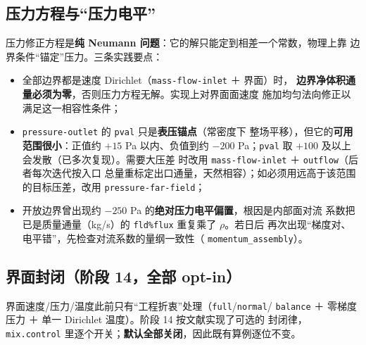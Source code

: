 \documentclass[11pt,a4paper]{ctexart}
\begin{document}
\subsection{压力方程与``压力电平''}

压力修正方程是\textbf{纯 Neumann 问题}：它的解只能定到相差一个常数，物理上靠
边界条件``锚定''压力。三条实践要点：

\begin{itemize}\itemsep2pt
  \item 全部边界都是速度 Dirichlet（\texttt{mass-flow-inlet} ＋ 界面）时，
        \textbf{边界净体积通量必须为零}，否则压力方程无解。实现上对界面面速度
        施加均匀法向修正以满足这一相容性条件；
  \item \texttt{pressure-outlet} 的 \texttt{pval} 只是\textbf{表压锚点}（常密度下
        整场平移），但它的\textbf{可用范围很小}：正值约 $+15$ Pa 以内、负值到约
        $-200$ Pa；\texttt{pval} 取 $+100$ 及以上会发散（已多次复现）。需要大压差
        时改用 \texttt{mass-flow-inlet} ＋ \texttt{outflow}（后者每次迭代按入口
        总量重标定出口通量，天然相容）；如必须用远高于该范围的目标压差，改用
        \texttt{pressure-far-field}；
  \item 开放边界曾出现约 $-250$ Pa 的\textbf{绝对压力电平偏置}，根因是内部面对流
        系数把已是质量通量（kg/s）的 \texttt{fld\%flux} 重复乘了 $\rho$。若日后
        再次出现``梯度对、电平错''，先检查对流系数的量纲一致性（
        \texttt{momentum\_assembly}）。
\end{itemize}

\subsection{界面封闭（阶段 14，全部 opt-in）}\label{sec:ifaceclos}

界面速度/压力/温度此前只有``工程折衷''处理（\texttt{full}/\texttt{normal}/
\texttt{balance} ＋ 零梯度压力 ＋ 单一 Dirichlet 温度）。阶段 14 按文献实现了可选的
封闭律，\texttt{mix.control} 里逐个开关；\textbf{默认全部关闭}，因此既有算例逐位不变。
\end{document}

